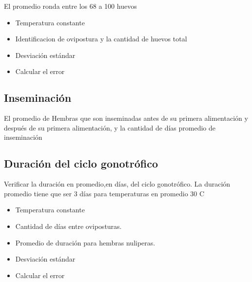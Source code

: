 El promedio ronda entre los 68 a 100 huevos

\begin{itemize}
    \item Temperatura constante 
    \item Identificacion de ovipostura y la cantidad de huevos total
    \item Desviación estándar
    \item Calcular el error
\end{itemize}


\subsection{Inseminación}
El promedio de Hembras que son inseminadas antes de su primera alimentación y después de su primera
alimentación, y la cantidad de días promedio de inseminación
 
\subsection{Duración del ciclo gonotrófico}
Verificar la duración en promedio,en días, del ciclo gonotrófico. La duración promedio tiene que ser 3
días para temperaturas en promedio 30 C

\begin{itemize}
    \item Temperatura constante 
    \item Cantidad de días entre oviposturas.
    \item Promedio de duración para hembras nuliperas.
    \item Desviación estándar
    \item Calcular el error
\end{itemize}
